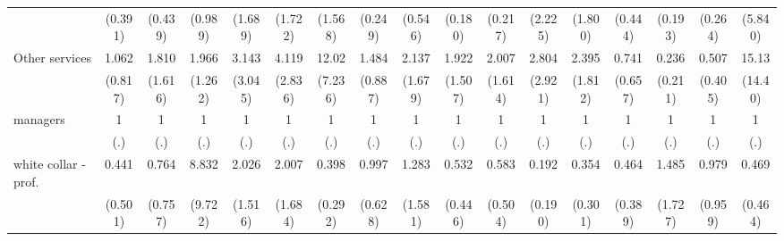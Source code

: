 {\begin{tabular}{l*{16}{c}}
                    &     (0.391)         &     (0.439)         &     (0.989)         &     (1.689)         &     (1.722)         &     (1.568)         &     (0.249)         &     (0.546)         &     (0.180)         &     (0.217)         &     (2.225)         &     (1.800)         &     (0.444)         &     (0.193)         &     (0.264)         &     (5.840)         \\
[1em]
Other services      &       1.062         &       1.810         &       1.966         &       3.143         &       4.119\sym{*}  &       12.02\sym{***}&       1.484         &       2.137         &       1.922         &       2.007         &       2.804         &       2.395         &       0.741         &       0.236         &       0.507         &       15.13\sym{**} \\
                    &     (0.817)         &     (1.616)         &     (1.262)         &     (3.045)         &     (2.836)         &     (7.236)         &     (0.887)         &     (1.679)         &     (1.507)         &     (1.614)         &     (2.921)         &     (1.812)         &     (0.657)         &     (0.211)         &     (0.405)         &     (14.40)         \\
[1em]
managers            &           1         &           1         &           1         &           1         &           1         &           1         &           1         &           1         &           1         &           1         &           1         &           1         &           1         &           1         &           1         &           1         \\
                    &         (.)         &         (.)         &         (.)         &         (.)         &         (.)         &         (.)         &         (.)         &         (.)         &         (.)         &         (.)         &         (.)         &         (.)         &         (.)         &         (.)         &         (.)         &         (.)         \\
[1em]
white collar - prof.&       0.441         &       0.764         &       8.832\sym{*}  &       2.026         &       2.007         &       0.398         &       0.997         &       1.283         &       0.532         &       0.583         &       0.192         &       0.354         &       0.464         &       1.485         &       0.979         &       0.469         \\
                    &     (0.501)         &     (0.757)         &     (9.722)         &     (1.516)         &     (1.684)         &     (0.292)         &     (0.628)         &     (1.581)         &     (0.446)         &     (0.504)         &     (0.190)         &     (0.301)         &     (0.389)         &     (1.727)         &     (0.959)         &     (0.464)         \\

\end{tabular}}
